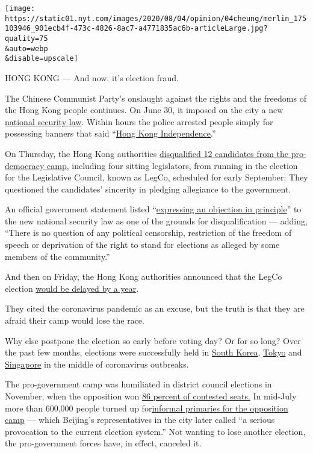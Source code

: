 \texttt{[image: https://static01.nyt.com/images/2020/08/04/opinion/04cheung/merlin\_175103946\_901ecb4f-473c-4826-8ac7-a4771835ac6b-articleLarge.jpg?quality=75\\\&auto=webp\\\&disable=upscale]}

HONG KONG --- And now, it's election fraud.

The Chinese Communist Party's onslaught against the rights and the
freedoms of the Hong Kong people continues. On June 30, it imposed on
the city a new
\href{https://www.gld.gov.hk/egazette/pdf/20202448e/egn2020244872.pdf}{national
security law}. Within hours the police arrested people simply for
possessing banners that said
``\href{https://twitter.com/hkpoliceforce/status/1278201222457987073}{Hong
Kong Independence}.''

On Thursday, the Hong Kong authorities
\href{https://www.nytimes.com/2020/07/29/world/asia/hong-kong-arrests-security-law.html}{disqualified
12 candidates from the pro-democracy camp}, including four sitting
legislators, from running in the election for the Legislative Council,
known as LegCo, scheduled for early September: They questioned the
candidates' sincerity in pledging allegiance to the government.

An official government statement listed
``\href{https://www.info.gov.hk/gia/general/202007/30/P2020073000481.htm}{expressing
an objection in principle}'' to the new national security law as one of
the grounds for disqualification --- adding, ``There is no question of
any political censorship, restriction of the freedom of speech or
deprivation of the right to stand for elections as alleged by some
members of the community.''

And then on Friday, the Hong Kong authorities announced that the LegCo
election
\href{https://www.nytimes.com/2020/07/31/world/asia/hong-kong-election-delayed.html}{would
be delayed by a year}.

They cited the coronavirus pandemic as an excuse, but the truth is that
they are afraid their camp would lose the race.

Why else postpone the election so early before voting day? Or for so
long? Over the past few months, elections were successfully held in
\href{https://www.nytimes.com/2020/04/15/world/asia/south-korea-election.html}{South
Korea},
\href{https://www.nytimes.com/2020/07/05/world/asia/tokyo-governor-election.html}{Tokyo}
and
\href{https://www.nytimes.com/2020/07/10/world/asia/singapore-election-results.html}{Singapore}
in the middle of coronavirus outbreaks.

The pro-government camp was humiliated in district council elections in
November, when the opposition won
\href{https://www.nytimes.com/2019/11/24/world/asia/hong-kong-election-results.html}{86
percent of contested seats.} In mid-July more than 600,000 people turned
up
for\href{https://hongkongfp.com/2020/07/14/serious-provocation-beijing-blasts-hong-kong-democrat-primaries-after-initial-results-reveal/}{informal
primaries for the opposition camp} --- which Beijing's representatives
in the city later called ``a serious provocation to the current election
system.'' Not wanting to lose another election, the pro-government
forces have, in effect, canceled it.

